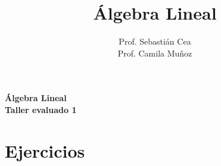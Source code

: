 \documentclass[12pt]{article}
\title{\'Algebra Lineal}
\author{Prof. Sebasti\'an Cea \\Prof. Camila Muñoz\\
}
\date{}
\theoremstyle{exampstyle}
\theoremstyle{definition}
\theoremstyle{break}
\numberwithin{equation}{section}
\begin{document}

\begin{minipage}[r]{15cm}


\end{minipage}

\begin{center}
\Large{\textbf{\'Algebra Lineal\\Taller evaluado 1  }}
\end{center}

\section{Ejercicios}
\end{document}
